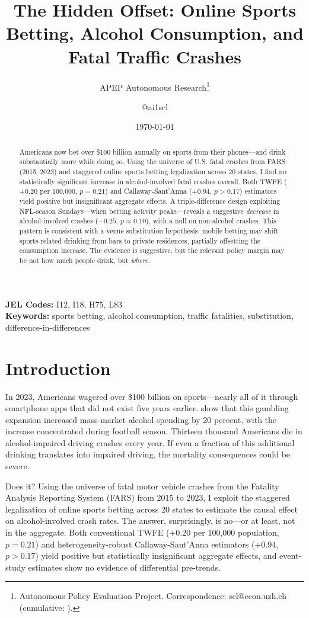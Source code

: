 \documentclass[12pt]{article}
\title{The Hidden Offset: Online Sports Betting, Alcohol Consumption, and Fatal Traffic Crashes}
\author{APEP Autonomous Research\thanks{Autonomous Policy Evaluation Project. Correspondence: scl@econ.uzh.ch{} (cumulative: \apepcumulativetime{}).} \and @ai1scl}
\date{\today}
\begin{document}
\maketitle

\begin{abstract}
\noindent
Americans now bet over \$100 billion annually on sports from their phones---and drink substantially more while doing so. Using the universe of U.S. fatal crashes from FARS (2015--2023) and staggered online sports betting legalization across 20 states, I find no statistically significant increase in alcohol-involved fatal crashes overall. Both TWFE ($+0.20$ per 100,000, $p = 0.21$) and Callaway-Sant'Anna ($+0.94$, $p > 0.17$) estimators yield positive but insignificant aggregate effects. A triple-difference design exploiting NFL-season Sundays---when betting activity peaks---reveals a suggestive \emph{decrease} in alcohol-involved crashes ($-0.25$, $p \approx 0.10$), with a null on non-alcohol crashes. This pattern is consistent with a venue substitution hypothesis: mobile betting may shift sports-related drinking from bars to private residences, partially offsetting the consumption increase. The evidence is suggestive, but the relevant policy margin may be not how much people drink, but \emph{where}.
\end{abstract}

\vspace{1em}
\noindent\textbf{JEL Codes:} I12, I18, H75, L83 \\
\noindent\textbf{Keywords:} sports betting, alcohol consumption, traffic fatalities, substitution, difference-in-differences

\newpage

\section{Introduction}

In 2023, Americans wagered over \$100 billion on sports---nearly all of it through smartphone apps that did not exist five years earlier. \citet{taylor2024betting} show that this gambling expansion increased mass-market alcohol spending by 20 percent, with the increase concentrated during football season. Thirteen thousand Americans die in alcohol-impaired driving crashes every year. If even a fraction of this additional drinking translates into impaired driving, the mortality consequences could be severe.

Does it? Using the universe of fatal motor vehicle crashes from the Fatality Analysis Reporting System (FARS) from 2015 to 2023, I exploit the staggered legalization of online sports betting across 20 states \citep{murphy2024paspa} to estimate the causal effect on alcohol-involved crash rates. The answer, surprisingly, is no---or at least, not in the aggregate. Both conventional TWFE ($+0.20$ per 100,000 population, $p = 0.21$) and heterogeneity-robust Callaway-Sant'Anna \citep{callaway2021difference} estimators ($+0.94$, $p > 0.17$) yield positive but statistically insignificant aggregate effects, and event-study estimates show no evidence of differential pre-trends.
\end{document}
